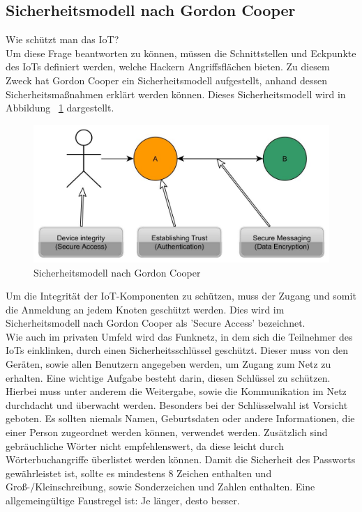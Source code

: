 \subsection{Sicherheitsmodell nach Gordon Cooper}\label{ss:Sicherheitsmodell}


Wie schützt man das \ac{IoT}?\\

Um diese Frage beantworten zu können, müssen die Schnittstellen und Eckpunkte des \ac{IoT}s definiert werden, welche Hackern Angriffsflächen bieten. Zu diesem Zweck hat Gordon Cooper ein Sicherheitsmodell aufgestellt, anhand dessen Sicherheitsmaßnahmen erklärt werden können. Dieses Sicherheitsmodell wird in Abbildung ~\ref{f:security} dargestellt.

\vspace{5 mm}
\begin{figure}[H] 
	\centering
	\includegraphics[scale=0.4]{Bilder/sicherheitsmodell}
	\caption{Sicherheitsmodell nach Gordon Cooper\cite{z:DesignElektronik}}
	\label{f:security}
\end{figure}
\vspace{5 mm}

Um die Integrität der \ac{IoT}-Komponenten zu schützen, muss der Zugang und somit die Anmeldung an jedem Knoten geschützt werden. Dies wird im Sicherheitsmodell nach Gordon Cooper als 'Secure Access' bezeichnet.\\
Wie auch im privaten Umfeld wird das Funknetz, in dem sich die Teilnehmer des \ac{IoT}s einklinken, durch einen Sicherheitsschlüssel geschützt. Dieser muss von den Geräten, sowie allen Benutzern angegeben werden, um Zugang zum Netz zu erhalten. Eine wichtige Aufgabe besteht darin, diesen Schlüssel zu schützen. Hierbei muss unter anderem die Weitergabe, sowie die Kommunikation im Netz durchdacht und überwacht werden. Besonders bei der Schlüsselwahl ist Vorsicht geboten. Es sollten niemals Namen, Geburtsdaten oder andere Informationen, die einer Person zugeordnet werden können, verwendet werden. Zusätzlich sind gebräuchliche Wörter nicht empfehlenswert, da diese leicht durch Wörterbuchangriffe überlistet werden können. Damit die Sicherheit des Passworts gewährleistet ist, sollte es mindestens 8 Zeichen enthalten und Groß-/Kleinschreibung, sowie Sonderzeichen und Zahlen enthalten. Eine allgemeingültige Faustregel ist: Je länger, desto besser.\\

